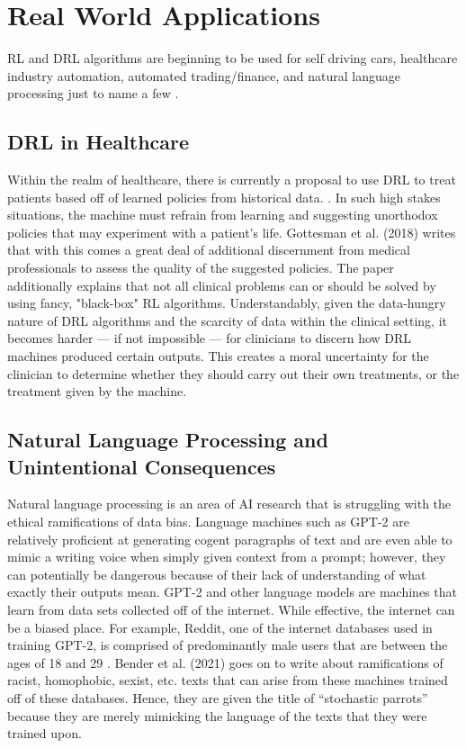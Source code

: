 \documentclass[10pt,twocolumn]{article}
\begin{document}
\section{Real World Applications}
RL and DRL algorithms are beginning to be used for self driving cars, healthcare industry automation, automated trading/finance, and natural language processing just to name a few \cite{mwiti_2021}.

\subsection{DRL in Healthcare}

Within the realm of healthcare, there is currently a proposal to use DRL to treat patients based off of learned policies from historical data. \cite{mwiti_2021}. In such high stakes situations, the machine must refrain from learning and suggesting unorthodox policies that may experiment with a patient's life. Gottesman et al. (2018) \cite{DBLP:journals/corr/abs-1805-12298} writes that with this comes a great deal of additional discernment from medical professionals to assess the quality of the suggested policies. The paper additionally explains that not all clinical problems can or should be solved by using fancy, "black-box" RL algorithms. Understandably, given the data-hungry nature of DRL algorithms and the scarcity of data within the clinical setting, it becomes harder — if not impossible — for clinicians to discern how DRL machines produced certain outputs. This creates a moral uncertainty for the clinician to determine whether they should carry out their own treatments, or the treatment given by the machine.

\subsection{Natural Language Processing and Unintentional Consequences}
Natural language processing is an area of AI research that is struggling with the ethical ramifications of data bias. Language machines such as GPT-2 are relatively proficient at generating cogent paragraphs of text and are even able to mimic a writing voice when simply given context from a prompt; however, they can potentially be dangerous because of their lack of understanding of what exactly their outputs mean. GPT-2 and other language models are machines that learn from data sets collected off of the internet. While effective, the internet can be a biased place. For example, Reddit, one of the internet databases used in training GPT-2, is comprised of predominantly male users that are between the ages of 18 and 29 \cite{Bender2021OnTD}. Bender et al. (2021) \cite{Bender2021OnTD} goes on to write about ramifications of racist, homophobic, sexist, etc. texts that can arise from these machines trained off of these databases.  Hence, they are given the title of “stochastic parrots” because they are merely mimicking the language of the texts that they were trained upon. 
\end{document}

